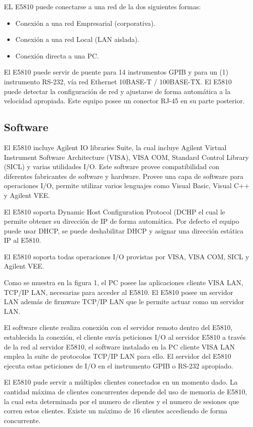 EL E5810 puede conectarse a una red de la dos siguientes formas: 

\begin{itemize}
	\item Conexión a una red Empresarial (corporativa).
	\item Conexión a una red Local (LAN aislada).
	\item Conexión directa a una PC.
\end{itemize}
El E5810 puede servir de puente para 14 instrumentos GPIB y para un (1) instrumento RS-232, vía red Ethernet 10BASE-T / 100BASE-TX. El E5810 puede detectar la configuración de red y ajustarse de forma automática a la velocidad apropiada. Este equipo posee un conector RJ-45 en su parte posterior. 

\subsection{Software}
El E5810 incluye Agilent IO libraries Suite, la cual incluye Agilent Virtual Instrument Software Architecture (VISA), VISA COM, Standard Control Library (SICL) y varias utilidades I/O. Este software provee compatibilidad con diferentes fabricantes de software y hardware. Provee una capa de software para operaciones I/O, permite utilizar varios lenguajes como Visual Basic, Visual C++ y Agilent VEE.

El E5810 soporta Dynamic Host Configuration Protocol (DCHP el cual le permite obtener su dirección de IP de forma automática. Por defecto el equipo puede usar DHCP, se puede deshabilitar DHCP y asignar una dirección estática IP al E5810.

El E5810 soporta todas operaciones I/O provistas por VISA, VISA COM, SICL y Agilent VEE. 

Como se muestra en la figura 1, el PC posee las aplicaciones cliente VISA LAN, TCP/IP LAN, necesarias para acceder al E5810. El E5810 posee un servidor LAN además de firmware TCP/IP LAN que le permite actuar como un servidor LAN.

El software cliente realiza conexión con el servidor remoto dentro del E5810, establecida la conexión, el cliente envía peticiones I/O al servidor E5810 a través de la red al servidor E5810, el software instalado en la PC cliente VISA LAN emplea la suite de protocolos TCP/IP LAN para ello. El servidor del E5810 ejecuta estas peticiones de I/O en el instrumento GPIB o RS-232 apropiado.

El E5810 pude servir a múltiples clientes conectados en un momento dado. La cantidad máxima de clientes concurrentes depende del uso de memoria de E5810, la cual esta determinada por el numero de clientes y el numero de sesiones que corren estos clientes. Existe un máximo de 16 clientes accediendo de forma concurrente.


